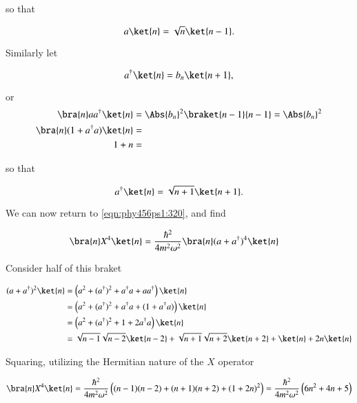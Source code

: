 so that

\begin{equation}\label{eqn:phy456ps1:380}
a \ket{n} = \sqrt{n} \ket{n - 1}.
\end{equation}

Similarly let

\begin{equation}\label{eqn:phy456ps1:400}
a^\dagger \ket{n} = b_n \ket{n + 1},
\end{equation}

or
\begin{align*}
\bra{n} a a^\dagger \ket{n} &= \Abs{b_n}^2 \braket{n - 1}{n-1} = \Abs{b_n}^2 \\
\bra{n} (1 + a^\dagger a) \ket{n} &= \\
1 + n &=
\end{align*}

so that

\begin{equation}\label{eqn:phy456ps1:440}
a^\dagger \ket{n} = \sqrt{n+1} \ket{n + 1}.
\end{equation}

We can now return to \ref{eqn:phy456ps1:320}, and find

\begin{align*}
\bra{n} X^4 \ket{n}
&=
\frac{\hbar^2}{4 m^2 \omega^2} \bra{n} (a + a^\dagger)^4 \ket{n}
\end{align*}

Consider half of this braket

\begin{align*}
(a + a^\dagger)^2 \ket{n}
&=
\left( a^2 + (a^\dagger)^2 + a^\dagger a + a a^\dagger \right) \ket{n} \\
&=
\left( a^2 + (a^\dagger)^2 + a^\dagger a + (1 + a^\dagger a) \right) \ket{n} \\
&=
\left( a^2 + (a^\dagger)^2 + 1 + 2 a^\dagger a \right) \ket{n} \\
&=
\sqrt{n-1}\sqrt{n-2} \ket{n-2}
+
\sqrt{n+1}\sqrt{n+2} \ket{n + 2}
+
\ket{n}
+  2 n \ket{n}
\end{align*}

Squaring, utilizing the Hermitian nature of the $X$ operator %

\begin{equation}\label{eqn:phy456ps1:500}
\bra{n} X^4 \ket{n}
=
\frac{\hbar^2}{4 m^2 \omega^2}
\left(
(n-1)(n-2) + (n+1)(n+2) + (1 + 2n)^2
\right)
=
\frac{\hbar^2}{4 m^2 \omega^2}
\left( 6 n^2 + 4 n + 5 \right)
\end{equation}

